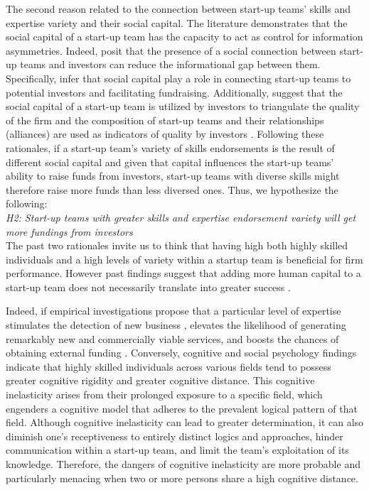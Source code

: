 \documentclass[12pt]{article}
\begin{document}
The second reason related to the connection between start-up teams' skills and expertise variety and their social capital. The literature demonstrates that the social capital of a start-up team has the capacity to act as control for information asymmetries. Indeed, \citet{huang2017resources, shane2002organizational} posit that the presence of a social connection between start-up teams and investors can reduce the informational gap between them. Specifically, \citet{shane2002network} infer that social capital play a role in connecting start-up teams to potential investors and facilitating fundraising. Additionally, \citet{hoenig2015quality} suggest that the social capital of a start-up team is utilized by investors to triangulate the quality of the firm and the composition of start-up teams and their relationships (alliances) are used as indicators of quality by investors \citep{plummer2016better, semrau2014exactly}. Following these rationales, if a start-up team's variety of skills endorsements is the result of different social capital and given that capital influences the start-up teams' ability to raise funds from investors, start-up teams with diverse skills might therefore raise more funds than less diversed ones. Thus, we hypothesize the following: \\

\noindent \textit{H2: Start-up teams with greater skills and expertise endorsement variety will get more fundings from investors} \\

The past two rationales invite us to think that having high both highly skilled individuals and a high levels of variety within a startup team is beneficial for firm performance. However past findings suggest that adding more human capital to a start-up team does not necessarily translate into greater success \citep{pierce2013too}.

Indeed, if empirical investigations propose that a particular level of expertise stimulates the detection of new business \citep{shane2000promise, marvel2016human}, elevates the likelihood of generating remarkably new and commercially viable services, and boosts the chances of obtaining external funding \citep{beckman2007early, marvel2007technology}. Conversely, cognitive and social psychology findings indicate that highly skilled individuals across various fields tend to possess greater cognitive rigidity and greater cognitive distance. This cognitive inelasticity arises from their prolonged exposure to a specific field, which engenders a cognitive model that adheres to the prevalent logical pattern of that field. Although cognitive inelasticity can lead to greater determination, it can also diminish one's receptiveness to entirely distinct logics and approaches, hinder communication within a start-up team, and limit the team's exploitation of its knowledge. Therefore, the dangers of cognitive inelasticity are more probable and particularly menacing when two or more persons share a high cognitive distance.
\end{document}
